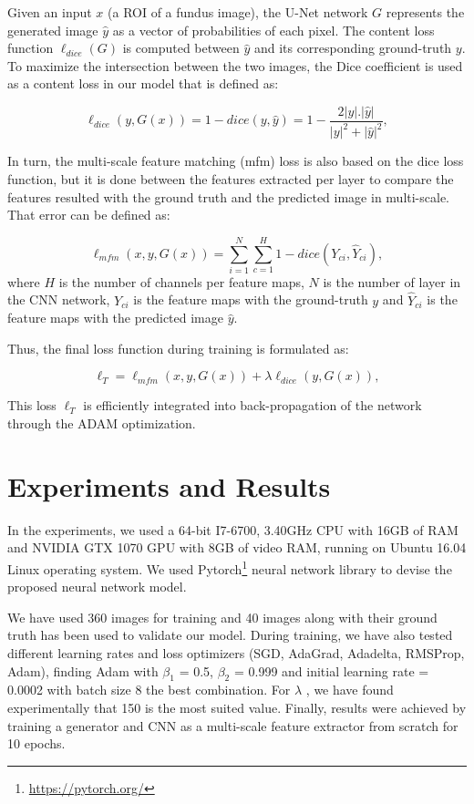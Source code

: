 \documentclass[runningheads,a4paper]{llncs}
\begin{document}
Given an input $x$ (a ROI of a fundus image), the U-Net network $G$ represents the generated image $\hat{y}$ as a vector of probabilities of each pixel. The content loss function $\ell_{dice}(G)$ is computed between $\hat{y}$ and its corresponding ground-truth $y$. To maximize the intersection between the two images, the Dice coefficient is used as a content loss in our model that is defined as:

\begin{equation}
    \ell_{dice}(y,G(x))= 1- dice(y, \hat{y}) = 1- \frac{2 |y| . | \hat{y} |}{|y|^2 + | \hat{y} |^2} , \label{equation:dc}
\end{equation}

In turn, the multi-scale feature matching (mfm) loss is also based on the dice loss function, but it is done between the features extracted per layer to compare the features resulted with the ground truth and the predicted image in multi-scale. That error can be defined as:

\begin{equation}
  \ell_{mfm} (x, y, G(x))= \sum_{i=1}^{N} \sum_{c=1}^{H} 1- dice(Y_{ci}, \hat{Y}_{ci}), 
 \label{equation:dc}
\end{equation}
where $H$ is the number of channels per feature maps, $N$ is the number of layer in the CNN network, $Y_{ci}$ is the feature maps with the ground-truth $y$ and $\hat{Y}_{ci}$ is the feature maps with the predicted image $\hat{y}$.

Thus, the final loss function during training is formulated as:

\begin{equation}
    \ell_{T}=\ell_{mfm}(x,y,G(x))+ \lambda \ell_{dice}(y,G(x)), \label{equation:dc}
\end{equation}

This loss $\ell_{T}$ is efficiently integrated into back-propagation of the network through the ADAM optimization.

\section{Experiments and Results}

In the experiments, we used a 64-bit I7-6700, 3.40GHz CPU with 16GB of RAM and NVIDIA GTX 1070 GPU with 8GB of video RAM, running on Ubuntu 16.04 Linux operating system. We used Pytorch\footnote{\url{https://pytorch.org/}} neural network library to devise the proposed neural network model.

We have used 360 images for training and 40 images along with their ground truth has been used to validate our model. During training, we have also tested different learning rates and loss optimizers (SGD, AdaGrad, Adadelta, RMSProp, Adam), finding Adam with $\beta_1$ = 0.5, $\beta_2$ = 0.999 and initial learning rate = 0.0002 with batch size 8 the best combination. For $\lambda$ , we have found experimentally that 150 is the most suited value. Finally, results were achieved by training a generator and CNN as a multi-scale feature extractor from scratch for 10 epochs.
\end{document}
